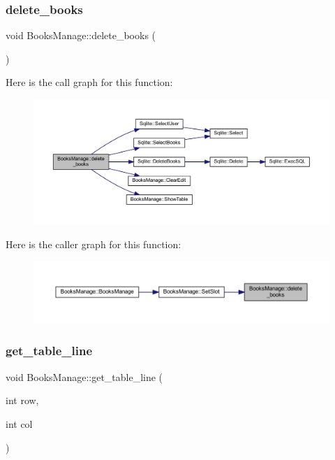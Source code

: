 \subsubsection{\texorpdfstring{delete\_books}{delete\_books}}
{\footnotesize\ttfamily void Books\+Manage\+::delete\+\_\+books (\begin{DoxyParamCaption}{ }\end{DoxyParamCaption})\hspace{0.3cm}{\ttfamily [slot]}}

Here is the call graph for this function\+:
\nopagebreak
\begin{figure}[H]
\begin{center}
\leavevmode
\includegraphics[width=350pt]{class_books_manage_ae8adc7f70a2e95f5a5991137e11a18ae_cgraph}
\end{center}
\end{figure}
Here is the caller graph for this function\+:
\nopagebreak
\begin{figure}[H]
\begin{center}
\leavevmode
\includegraphics[width=350pt]{class_books_manage_ae8adc7f70a2e95f5a5991137e11a18ae_icgraph}
\end{center}
\end{figure}
\mbox{\label{class_books_manage_a0269967278f32edfd3f14ccff0a41715}} 
\subsubsection{\texorpdfstring{get\_table\_line}{get\_table\_line}}
{\footnotesize\ttfamily void Books\+Manage\+::get\+\_\+table\+\_\+line (\begin{DoxyParamCaption}\item[{int}]{row,  }\item[{int}]{col }\end{DoxyParamCaption})\hspace{0.3cm}{\ttfamily [slot]}}

